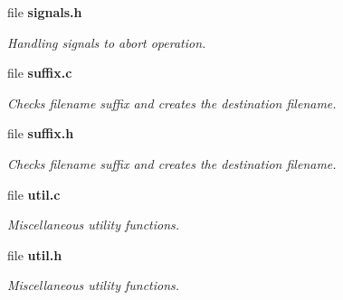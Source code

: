 \begin{DoxyCompactItemize}
file {\bf signals.\-h}
\begin{DoxyCompactList}\small\item\em Handling signals to abort operation. \end{DoxyCompactList}\item 
file {\bf suffix.\-c}
\begin{DoxyCompactList}\small\item\em Checks filename suffix and creates the destination filename. \end{DoxyCompactList}\item 
file {\bf suffix.\-h}
\begin{DoxyCompactList}\small\item\em Checks filename suffix and creates the destination filename. \end{DoxyCompactList}\item 
file {\bf util.\-c}
\begin{DoxyCompactList}\small\item\em Miscellaneous utility functions. \end{DoxyCompactList}\item 
file {\bf util.\-h}
\begin{DoxyCompactList}\small\item\em Miscellaneous utility functions. \end{DoxyCompactList}\end{DoxyCompactItemize}
